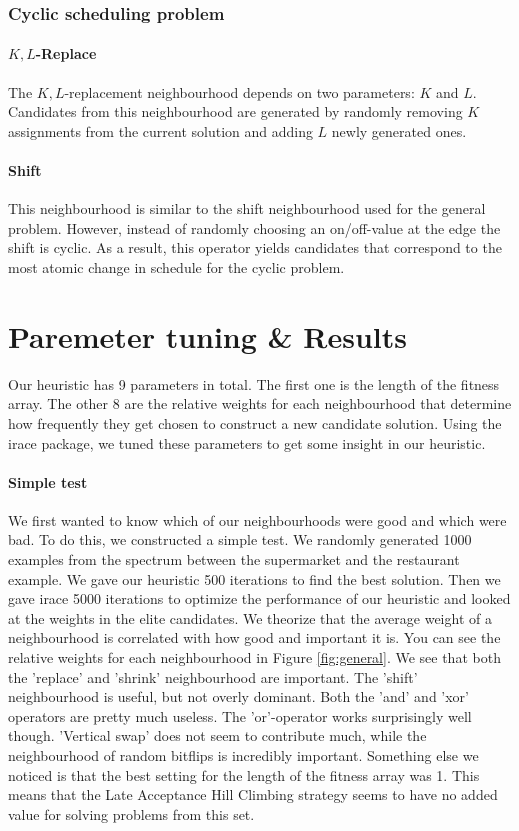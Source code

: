\documentclass[]{article}
\begin{document}
\subsubsection{Cyclic scheduling problem}
\paragraph{$K,L$-Replace}
The $K,L$-replacement neighbourhood depends on two parameters: $K$ and $L$. Candidates from this neighbourhood are generated by randomly removing $K$ assignments from the current solution and adding $L$ newly generated ones.

\paragraph{Shift}
This neighbourhood is similar to the shift neighbourhood used for the general problem. However, instead of randomly choosing an on/off-value at the edge the shift is cyclic.
As a result, this operator yields candidates that correspond to the most atomic change in schedule for the cyclic problem.

\section{Paremeter tuning \& Results}
Our heuristic has 9 parameters in total. The first one is the length of the fitness array. The other 8 are the relative weights for each neighbourhood that determine how frequently they get chosen to construct a new candidate solution. Using the irace package, we tuned these parameters to get some insight in our heuristic.

\paragraph{Simple test}
We first wanted to know which of our neighbourhoods were good and which were bad. To do this, we constructed a simple test. We randomly generated 1000 examples from the spectrum between the supermarket and the restaurant example. We gave our heuristic 500 iterations to find the best solution. Then we gave irace 5000 iterations to optimize the performance of our heuristic and looked at the weights in the elite candidates. We theorize that the average weight of a neighbourhood is correlated with how good and important it is. You can see the relative weights for each neighbourhood in Figure \ref{fig:general}. We see that both the 'replace' and 'shrink' neighbourhood are important. The 'shift' neighbourhood is useful, but not overly dominant. Both the 'and' and 'xor' operators are pretty much useless. The 'or'-operator works surprisingly well though. 'Vertical swap' does not seem to contribute much, while the neighbourhood of random bitflips is incredibly important. Something else we noticed is that the best setting for the length of the fitness array was 1. This means that the Late Acceptance Hill Climbing strategy seems to have no added value for solving problems from this set.
\end{document}
